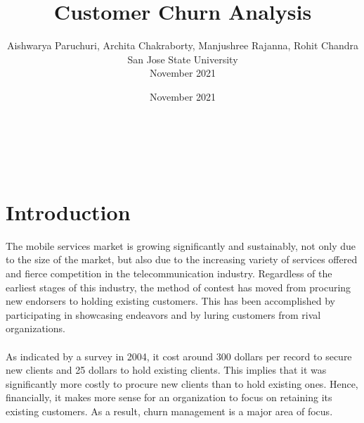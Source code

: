\documentclass[a4paper, 10pt, conference]{ieeeconf}      %
\title{\LARGE \bf
Customer Churn Analysis}
\author{Aishwarya Paruchuri, Archita Chakraborty, Manjushree Rajanna, Rohit Chandra\\San Jose State University\\ November 2021%
}
\date{November 2021}
\begin{document}
\maketitle
\thispagestyle{empty}
\pagestyle{empty}


\\\
\begin{abstract}


\end{abstract}


\section{\textbf{Introduction}}
The mobile services market is growing significantly and sustainably, not only due to the size of the market, but also due to the increasing variety of services offered and fierce competition in the telecommunication industry. Regardless of the earliest stages of this industry, the method of contest has moved from procuring new endorsers to holding existing customers. This has been accomplished by participating in showcasing endeavors and by luring customers from rival organizations.
\\
\\As indicated by a survey in 2004, it cost around 300 dollars per record to secure new clients and 25 dollars to hold existing clients. This implies that it was significantly more costly to procure new clients than to hold existing ones. Hence, ﬁnancially, it makes more sense for an organization to focus on retaining its existing customers. As a result, churn management is a major area of focus. 

\\\
\end{document}

